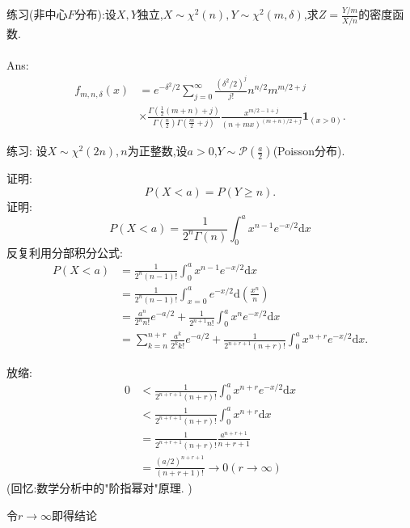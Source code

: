 	\begin{frame}
		练习(非中心$F$分布):设$X,Y$独立,$X\sim\chi^2(n),Y\sim\chi^2(m,\delta)$,求$Z=\frac{Y/m}{X/n}$的密度函数.
		\\ \hspace*{\fill} \\%
		Ans:
		\begin{equation}
			\begin{split}
				f_{m,n,\delta}(x) &= e^{-\delta^2/2}\sum_{j=0}^{\infty}\frac{(\delta^2/2)^j}{j!}n^{n/2}m^{m/2+j} \\
				&\times \frac{\Gamma(\frac{1}{2}(m+n)+j)}{\Gamma(\frac{n}{2})\Gamma(\frac{m}{2}+j)}
				\frac{x^{m/2-1+j}}{(n+mx)^{(m+n)/2+j}}\bm{1}_{(x>0)}.
			\end{split}
		\end{equation}
	\end{frame}

	\begin{frame}
		练习: 设$X\sim\chi^2(2n),n$为正整数,设$a>0$,$Y\sim\mathcal{P}(\frac{a}{2})$(Poisson分布).
		
		证明:
		\begin{equation}
			P(X<a) = P(Y\geqslant n).
		\end{equation}
		证明: \begin{equation}
			P(X<a) = \frac{1}{2^n\Gamma(n)}\int_{0}^{a}x^{n-1}e^{-x/2}\mathrm{d}x
		\end{equation}
		反复利用分部积分公式:
		\begin{equation}
			\begin{split}
				P(X<a) &= \frac{1}{2^n(n-1)!}\int_{0}^{a}x^{n-1}e^{-x/2}\mathrm{d}x \\
				&= \frac{1}{2^n(n-1)!}\int_{x=0}^{a}e^{-x/2}\mathrm{d}\left(\frac{x^n}{n}\right) \\
				&= \frac{a^n}{2^nn!}e^{-a/2}+\frac{1}{2^{n+1}n!}\int_{0}^{a}x^{n}e^{-x/2}\mathrm{d}x \\
				&= \sum_{k=n}^{n+r}\frac{a^k}{2^kk!}e^{-a/2}+\frac{1}{2^{n+r+1}(n+r)!}\int_{0}^{a}x^{n+r}e^{-x/2}\mathrm{d}x.
			\end{split}
		\end{equation}
	\end{frame}

	\begin{frame}
		放缩:
		\begin{equation}
			\begin{split}
				0&<\frac{1}{2^{n+r+1}(n+r)!}\int_{0}^{a}x^{n+r}e^{-x/2}\mathrm{d}x \\ &<\frac{1}{2^{n+r+1}(n+r)!}\int_{0}^{a}x^{n+r}\mathrm{d}x \\
				&=\frac{1}{2^{n+r+1}(n+r)!}\frac{a^{n+r+1}}{n+r+1} \\
				&=\frac{(a/2)^{n+r+1}}{(n+r+1)!}\rightarrow 0(r\rightarrow\infty)
			\end{split}
		\end{equation}
		(回忆:数学分析中的"阶指幂对"原理.	)
		
		令$r\rightarrow\infty$即得结论
	\end{frame}

